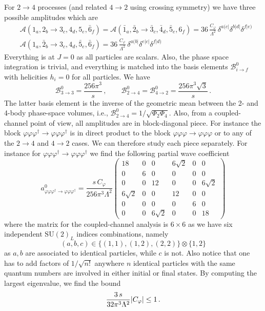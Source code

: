 \documentclass[a4paper,11pt]{article}
\begin{document}
For $2\to4$ processes (and related $4\to2$ using crossing symmetry) we have three possible amplitudes which are 
\begin{align}
    &\mathcal{A}(1_a,2_b\to 3_c,4_d,5_e,\bar{6}_f)=\mathcal{A}(\bar{1}_a,\bar{2}_b\to \bar{3}_c,\bar{4}_d,\bar{5}_e,6_f)=36\,\frac{C_\varphi}{\Lambda^2}\,\delta^{a(c|}\delta^{b|d|}\delta^{f|e)}\\
    &\mathcal{A}(1_a,\bar{2}_b\to 3_c,4_d,\bar{5}_e,\bar{6}_f)=36\,\frac{C_\varphi}{\Lambda^2}\,\delta^{a(b|}\delta^{e|c|}\delta^{f|d)}
\end{align}
Everything is at $J=0$ as all particles are scalars. Also, the phase space integration is trivial, and everything is matched into the basis elements $\mathcal{B}_{i\to f}^0$ with helicities $h_i=0$ for all particles. We have
\begin{equation}\label{eq: basis element J=0 full h=0}
    \mathcal{B}_{3\to 3}^0=\frac{256\pi^3}{s}\,,\qquad \mathcal{B}_{2\to 4}^0=\mathcal{B}_{4\to 2}^0=\frac{256\pi^3\sqrt{3}}{s}\,.
\end{equation}
The latter basis element is the inverse of the geometric mean between the 2- and 4-body phase-space volumes, i.e., $\mathcal{B}_{2\to 4}^0 = 1/\sqrt{\Phi_2 \Phi_4}$.
Also, from a coupled-channel point of view, all amplitudes are in block-diagonal piece. For instance the block $\varphi\varphi\varphi^\dag\to \varphi\varphi\varphi^\dag$ is in direct product to the block $\varphi\varphi\varphi\to \varphi\varphi\varphi$ or to any of the $2\to4$ and $4\to 2$ cases. We can therefore study each piece separately. For instance for $\varphi\varphi\varphi^\dag\to \varphi\varphi\varphi^\dag$ we find the following partial wave coefficient
\begin{equation}
    a^0_{\varphi\varphi\varphi^\dag\to \varphi\varphi\varphi^\dag}=\frac{s\,C_\varphi}{256\pi^3\Lambda^2}\begin{pmatrix}
        18 & 0 & 0 & 6\sqrt{2} & 0 & 0 \\ 0 & 6 & 0 & 0 & 0 & 0 \\ 0 & 0 & 12 & 0 & 0 & 6\sqrt{2} \\ 6\sqrt{2} & 0 & 0 & 12 & 0 & 0 \\ 0 & 0 & 0 & 0 & 6 & 0 \\ 0 & 0 & 6\sqrt{2} & 0 & 0 & 18
    \end{pmatrix}
\end{equation}
where the matrix for the coupled-channel analysis is $6\times 6$ as we have six independent $\mathrm{SU}(2)_L$ indices combinations, namely
\begin{equation}
    (a,b,c)\in\{(1,1),(1,2),(2,2)\}\otimes \{1,2\}
\end{equation}
as $a,b$ are associated to identical particles, while $c$ is not. Also notice that one has to add factors of $1/\sqrt{n!}$ anywhere $n$ identical particles with the same quantum numbers are involved in either initial or final states. 
By computing the largest eigenvalue, we find the bound
\begin{equation}
    \frac{3\,s}{32\pi^3\Lambda^2}\abs{C_\varphi}\leq 1\,.
\end{equation}
\end{document}
